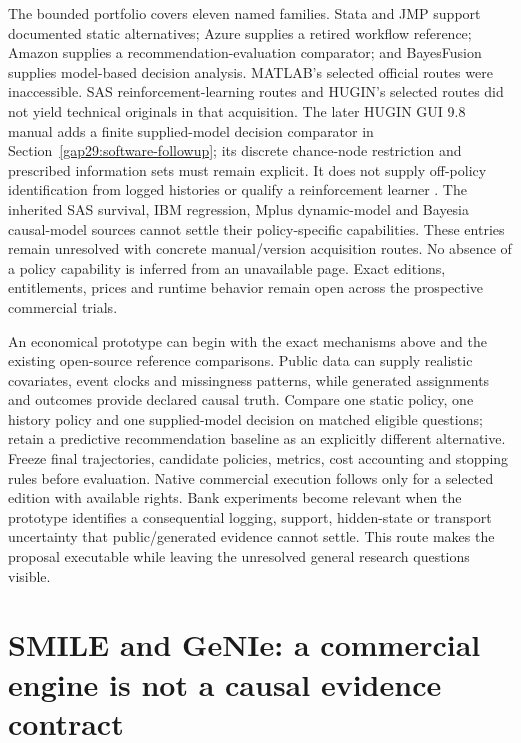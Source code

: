 The bounded portfolio covers eleven named families. Stata and JMP support
documented static alternatives; Azure supplies a retired workflow reference;
Amazon supplies a recommendation-evaluation comparator; and BayesFusion
supplies model-based decision analysis. MATLAB's selected official routes were
inaccessible. SAS reinforcement-learning routes and HUGIN's selected routes
did not yield technical originals in that acquisition. The later HUGIN GUI
9.8 manual adds a finite supplied-model decision comparator in
Section~\ref{gap29:software-followup}; its discrete chance-node restriction
and prescribed information sets must remain explicit. It does not supply
off-policy identification from logged histories or qualify a reinforcement
learner \citep{gap29hugin}. The inherited SAS survival, IBM regression,
Mplus dynamic-model and Bayesia causal-model sources cannot settle their
policy-specific capabilities. These entries remain unresolved with concrete
manual/version acquisition routes. No absence of a policy capability is
inferred from an unavailable page. Exact editions, entitlements, prices and
runtime behavior remain open across the prospective commercial trials.
\citep{exec16_cp_matrix}

An economical prototype can begin with the exact mechanisms above and the
existing open-source reference comparisons. Public data can supply realistic
covariates, event clocks and missingness patterns, while generated assignments
and outcomes provide declared causal truth. Compare one static policy,
one history policy and one supplied-model decision on matched eligible
questions; retain a predictive recommendation baseline as an explicitly
different alternative. Freeze final trajectories, candidate policies, metrics,
cost accounting and stopping rules before evaluation. Native commercial
execution follows only for a selected edition with available rights. Bank
experiments become relevant when the prototype identifies a consequential
logging, support, hidden-state or transport uncertainty that public/generated
evidence cannot settle. This route makes the proposal executable while leaving
the unresolved general research questions visible. \citep{exec16_cp_matrix}
\label{exec16:commercial-policy-end}


\section{SMILE and GeNIe: a commercial engine is not a causal evidence contract}
\label{sec:exec24-smile-reuse}

